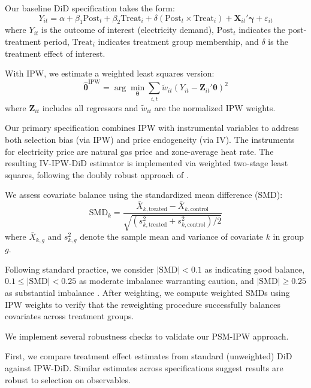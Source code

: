 \documentclass[a4paper,fleqn,longmktitle]{cas-sc}
\theoremstyle{plain}
\theoremstyle{definition}
\begin{document}
Our baseline DiD specification takes the form:
\begin{equation}
    Y_{it} = \alpha + \beta_1 \text{Post}_t + \beta_2 \text{Treat}_i + \delta (\text{Post}_t \times \text{Treat}_i) + \mathbf{X}_{it}'\boldsymbol{\gamma} + \varepsilon_{it}
\end{equation}
where $Y_{it}$ is the outcome of interest (electricity demand), $\text{Post}_t$ indicates the post-treatment period, $\text{Treat}_i$ indicates treatment group membership, and $\delta$ is the treatment effect of interest.

With IPW, we estimate a weighted least squares version:
\begin{equation}
    \hat{\boldsymbol{\theta}}^{\text{IPW}} = \arg\min_{\boldsymbol{\theta}} \sum_{i,t} \tilde{w}_{it} \left(Y_{it} - \mathbf{Z}_{it}'\boldsymbol{\theta}\right)^2
\end{equation}
where $\mathbf{Z}_{it}$ includes all regressors and $\tilde{w}_{it}$ are the normalized IPW weights.

Our primary specification combines IPW with instrumental variables to address both selection bias (via IPW) and price endogeneity (via IV). The instruments for electricity price are natural gas price and zone-average heat rate. The resulting IV-IPW-DiD estimator is implemented via weighted two-stage least squares, following the doubly robust approach of \citet{santanna2020doubly}.

We assess covariate balance using the standardized mean difference (SMD):
\begin{equation}
    \text{SMD}_k = \frac{\bar{X}_{k,\text{treated}} - \bar{X}_{k,\text{control}}}{\sqrt{(s^2_{k,\text{treated}} + s^2_{k,\text{control}})/2}}
\end{equation}
where $\bar{X}_{k,g}$ and $s^2_{k,g}$ denote the sample mean and variance of covariate $k$ in group $g$.

Following standard practice, we consider $|\text{SMD}| < 0.1$ as indicating good balance, $0.1 \leq |\text{SMD}| < 0.25$ as moderate imbalance warranting caution, and $|\text{SMD}| \geq 0.25$ as substantial imbalance \citep{austin2011introduction}. After weighting, we compute weighted SMDs using IPW weights to verify that the reweighting procedure successfully balances covariates across treatment groups.

We implement several robustness checks to validate our PSM-IPW approach.

First, we compare treatment effect estimates from standard (unweighted) DiD against IPW-DiD. Similar estimates across specifications suggest results are robust to selection on observables.
\end{document}
